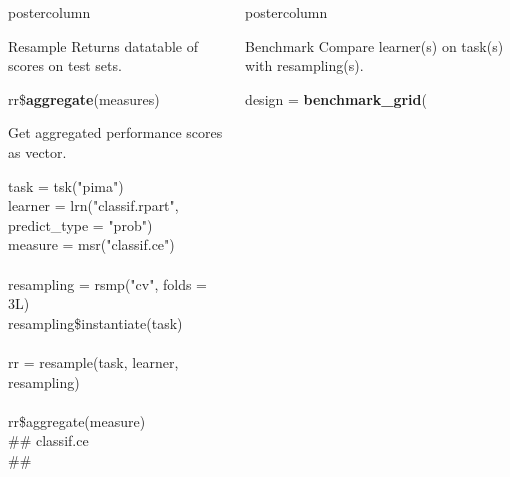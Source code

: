 \documentclass{beamer}
\newlength{\columnheight} %
\begin{document}
\begin{withoutheader}
\begin{frame}[fragile]{}
\begin{columns}
\begin{column}{.245\textwidth}
\begin{beamercolorbox}[center]{postercolumn}
\begin{minipage}{.98\textwidth}
{\begin{myblock}{Resample}
							Returns datatable of scores on test sets.
							\\
							\begin{codebox}
								rr\$\textbf{aggregate}(measures)
							\end{codebox}
						    Get aggregated performance scores as vector.
							\\
							\begin{codeboxexample}
								\footnotesize{
									task = tsk("pima")\\
									learner = lrn("classif.rpart", \\
									\hspace*{1ex}predict\_type = "prob")\\
									measure = msr("classif.ce")\\
									\vspace{1em}
									\\
									resampling = rsmp("cv", folds = 3L)\\
									resampling\$instantiate(task)\\
									\vspace{1em}
									\\
									rr = resample(task, learner, resampling)\\
									\vspace{1em}
									\\
									rr\$aggregate(measure)\\
									\#\# classif.ce\\
									\#\# \space\space\space\space 0.2643\\
								}
							\end{codeboxexample}
							\end{myblock}
					\vfill}
				\end{minipage}
			\end{beamercolorbox}
		\end{column}
		\begin{column}{.245\textwidth}
			\begin{beamercolorbox}[center]{postercolumn}
				\begin{minipage}{.98\textwidth}
					\parbox[t][\columnheight]{\textwidth}{
						\begin{myblock}{Benchmark}
                            Compare learner(s) on task(s) with resampling(s).
						\\
						\begin{codeboxmultiline}[width=19.4cm]
							design = \textbf{benchmark\_grid}(\\

\end{codeboxmultiline}
\end{myblock}}
\end{minipage}
\end{beamercolorbox}
\end{column}
\end{columns}
\end{frame}
\end{withoutheader}
\end{document}
